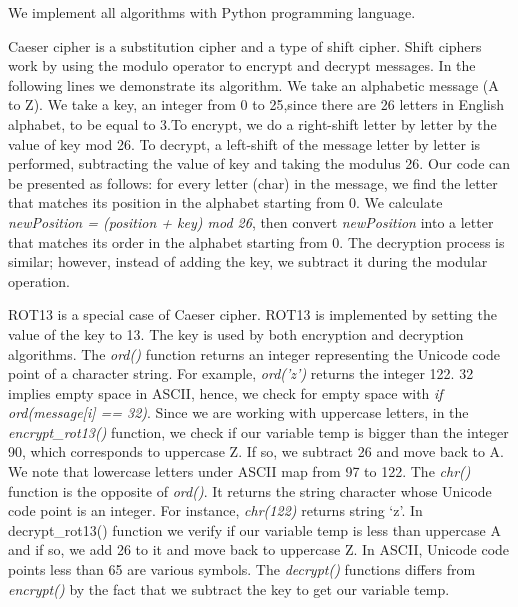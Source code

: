 We implement all algorithms with Python programming language. 

Caeser cipher is a substitution cipher and a type of shift cipher. Shift ciphers work by using the modulo operator to encrypt and decrypt messages. In the following lines we demonstrate its algorithm. We take an alphabetic message (A to Z). We take a key, an integer from 0 to 25,since there are 26 letters in English alphabet, to be equal to 3.To encrypt, we do a right-shift letter by letter by the value of key mod 26. To decrypt, a left-shift of the message letter by letter is performed, subtracting the value of key and taking the modulus 26. Our code can be presented as follows: for every letter (char) in the message, we find the letter that matches its position in the alphabet starting from 0. We calculate \textit{newPosition = (position + key) mod 26}, then convert \textit{newPosition} into a letter that matches its order in the alphabet starting from 0. The decryption process is similar; however, instead of adding the key, we subtract it during the modular operation.

ROT13 is a special case of Caeser cipher. ROT13 is implemented by setting the value of the key to 13. The key is used by both encryption and decryption algorithms. The \textit{ord()} function returns an integer representing the Unicode code point of a character string. For example, \textit{ord('z')} returns the integer 122. 32 implies empty space in ASCII, hence, we check for empty space with \textit{if ord(message[i] == 32)}. Since we are working with uppercase letters, in the \textit{encrypt\_rot13()} function, we check if our variable temp is bigger than the integer 90, which corresponds to uppercase Z. If so, we subtract 26 and move back to A. We note that lowercase letters under ASCII map from 97 to 122. The \textit{chr()} function is the opposite of \textit{ord()}. It returns the string character whose Unicode code point is an integer. For instance, \textit{chr(122)} returns string ‘z’. In decrypt\_rot13() function we verify if our variable temp is less than uppercase A and if so, we add 26 to it and move back to uppercase Z. In ASCII, Unicode code points less than 65 are various symbols. The \textit{decrypt()} functions differs from \textit{encrypt()} by the fact that we subtract the key to get our variable temp. 

